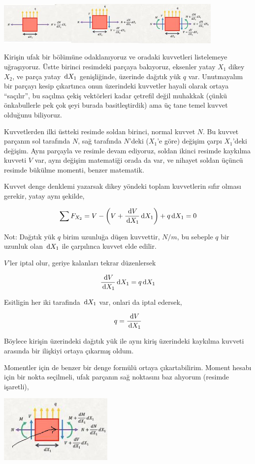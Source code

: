 \documentclass[12pt,fleqn]{article}\usepackage{../../common}
\begin{document}
\includegraphics[width=30em]{phy_020_strs_02_10.jpg}

Kirişin ufak bir bölümüne odaklanıyoruz ve oradaki kuvvetleri listelemeye
uğraşıyoruz. Üstte birinci resimdeki parçaya bakıyoruz, eksenler yatay $X_1$
dikey $X_2$, ve parça yatay $\,\mathrm{d} X_1$ genişliğinde, üzerinde dağıtık yük $q$
var. Unutmayalım bir parçayı kesip çıkartınca onun üzerindeki kuvvetler hayali
olarak ortaya ``saçılır'', bu saçılma çekiş vektörleri kadar çetrefil değil
muhakkak (çünkü önkabullerle pek çok şeyi burada basitleştirdik) ama üç tane
temel kuvvet olduğunu biliyoruz.

Kuvvetlerden ilki üstteki resimde soldan birinci, normal kuvvet $N$. Bu kuvvet
parçanın sol tarafında $N$, sağ tarafında $N$'deki ($X_1$'e göre) değişim çarpı
$X_1$'deki değişim. Aynı parçayla ve resimle devam ediyoruz, soldan ikinci
resimde kaykılma kuvveti $V$ var, aynı değişim matematiği orada da var, ve
nihayet soldan üçüncü resimde bükülme momenti, benzer matematik.

Kuvvet denge denklemi yazarsak dikey yöndeki toplam kuvvetlerin sıfır olması
gerekir, yatay aynı şekilde,

$$
\sum F_{X_2} = V - \left( V + \frac{\,\mathrm{d} V}{\,\mathrm{d} X_1} \,\mathrm{d} X_1 \right) + q \,\mathrm{d} X_1 = 0
$$

Not: Dağıtık yük $q$ birim uzunluğa düşen kuvvettir, $N/m$, bu sebeple $q$ bir
uzunluk olan $\,\mathrm{d} X_1$ ile çarpılınca kuvvet elde edilir.

$V$'ler iptal olur, geriye kalanları tekrar düzenlersek

$$
\frac{\,\mathrm{d} V}{\,\mathrm{d} X_1} \,\mathrm{d} X_1 = q \,\mathrm{d} X_1 
$$

Esitligin her iki tarafinda $\,\mathrm{d} X_1$ var, onlari da iptal edersek,

$$
q = \frac{\,\mathrm{d} V}{\,\mathrm{d} X_1} 
$$

Böylece kirişin üzerindeki dağıtık yük ile aynı kiriş üzerindeki kaykılma
kuvveti arasında bir ilişkiyi ortaya çıkarmış oldum. 

Momentler için de benzer bir denge formülü ortaya çıkartabilirim. Moment hesabı
için bir nokta seçilmeli, ufak parçanın sağ noktasını baz alıyorum (resimde
işaretli),

\includegraphics[width=15em]{phy_020_strs_02_11.jpg}
\end{document}
